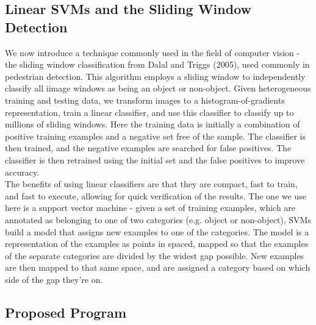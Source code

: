 \documentclass[12pt]{article}
\begin{document}
\subsection*{Linear SVMs and the Sliding Window Detection}
We now introduce a technique commonly used in the field of computer vision - the sliding window classification from Dalal and Triggs (2005), used commonly in pedestrian detection. This algorithm employs a sliding window to independently classify all iimage windows as being an object or non-object. Given heterogeneous training and testing data, we transform images to a histogram-of-gradients representation, train a linear classifier, and use this classifier to classify up to millions of sliding windows. Here the training data is initially a combination of positive training examples and a negative set free of the sample. The classifier is then trained, and the negative examples are searched for false positives. The classifier is then retrained using the initial set and the false positives to improve accuracy.\\
\indent The benefits of using linear classifiers are that they are compact, fast to train, and fast to execute, allowing for quick verification of the results. The one we use here is a support vector machine - given a set of training examples, which are annotated as belonging to one of two categories (e.g. object or non-object), SVMs build a model that assigns new examples to one of the categories. The model is a representation of the examples as points in spaced, mapped so that the examples of the separate categories are divided by the widest gap possible. New examples are then mapped to that same space, and are assigned a category based on which side of the gap they're on. 

\subsection*{Proposed Program}
\end{document}
